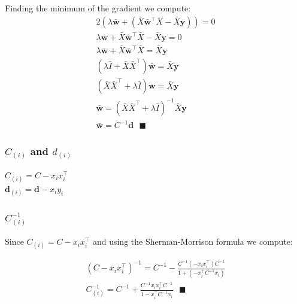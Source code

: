 \documentclass[11pt, oneside]{article}   	%
\begin{document}
Finding the minimum of the gradient we compute:
\begin{gather*}
2(\lambda \boldsymbol{\bar{w}} + (\bar{X}\boldsymbol{\bar{w}}^\top \bar{X} - \bar{X} \boldsymbol{y})) = 0\\
\lambda \boldsymbol{\bar{w}} + \bar{X}\boldsymbol{\bar{w}}^\top \bar{X} - \bar{X} \boldsymbol{y} = 0 \\
\lambda \boldsymbol{\bar{w}} + \bar{X}\boldsymbol{\bar{w}}^\top \bar{X} = \bar{X} \boldsymbol{y} \\
(\lambda \bar{I}  +\bar{X} \bar{X}^\top)\boldsymbol{\bar{w}} = \bar{X} \boldsymbol{y}\\
(\bar{X} \bar{X}^\top + \lambda \bar{I})\boldsymbol{\bar{w}} = \bar{X} \boldsymbol{y}\\
\boldsymbol{\bar{w}} = (\bar{X} \bar{X}^\top + \lambda \bar{I})^{-1}\bar{X} \boldsymbol{y}\\
\boldsymbol{\bar{w}} = C^{-1}\boldsymbol{d} \text{ } \blacksquare
\end{gather*}

\subsubsection{$C_{(i)}$ and $d_{(i)}$}
$C_{(i)} = C - x_{i}x_{i}^\top$\\
$\boldsymbol{d}_{(i)} = \boldsymbol{d} - x_i y_i$

\subsubsection{$C_{(i)}^{-1}$}
Since $C_{(i)} = C - x_{i}x_{i}^\top$ and using the Sherman-Morrison formula we compute:

\begin{gather*}
( C - x_{i}x_{i}^\top )^{-1} = C^{-1} - \frac{C^{-1} (-x_i x_i^\top) C^{-1}}{1 + (-x_i^\top C^{-1} x_i)}\\
C_{(i)}^{-1} = C^{-1} + \frac{C^{-1} x_i x_i^\top C^{-1}}{1 - x_i^\top C^{-1} x_i} \text{ } \blacksquare
\end{gather*}
\end{document}
